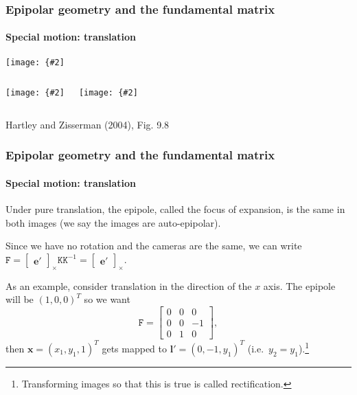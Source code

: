 \documentclass[aspectratio=169]{beamer}
\renewcommand{\vec}[1]{\boldsymbol{#1}}
\newcommand{\mat}[1]{\mathtt{#1}}
\newcommand{\crossmat}[1]{\begin{bmatrix} #1 \end{bmatrix}_{\times}}
\newcommand{\myfig}[3]{\centerline{\texttt{[image: \{\#2]}}}
    \centerline{\scriptsize #3}}
\begin{document}
\begin{frame}
\frametitle{Epipolar geometry and the fundamental matrix}
\framesubtitle{Special motion: translation}

\myfig{2.5in}{HZ-fig8-8a}{(a)}

\medskip

\begin{columns}
\column{1.5in}
\myfig{1.4in}{HZ-fig8-8b}{(b)}
\column{1.5in}
\myfig{1.4in}{HZ-fig8-8c}{(c)}
\end{columns}

\centerline{\scriptsize Hartley and Zisserman (2004), Fig. 9.8}

\end{frame}

\begin{frame}
\frametitle{Epipolar geometry and the fundamental matrix}
\framesubtitle{Special motion: translation}

Under pure translation, the epipole, called the \alert{focus of
  expansion}, is the \alert{same in both images} (we say the images
are \alert{auto-epipolar}).

\medskip

Since we have \alert{no rotation} and the \alert{cameras are the
  same}, we can write
$\mat{F}=\crossmat{\vec{e}'}\mat{K}\mat{K}^{-1}=\crossmat{\vec{e}'}$.

\medskip

As an example, consider translation in the direction of the $x$ axis.
The epipole will be $(1,0,0)^T$ so we want
\begin{equation*}
\mat{F}=\begin{bmatrix} 0 & 0 & 0 \\ 0 & 0 & -1 \\ 0 & 1 & 0
\end{bmatrix},
\end{equation*}
then $\vec{x}=(x_1,y_1,1)^T$ gets mapped to
$\vec{l}'=(0,-1,y_1)^T$ (i.e.\ $y_2=y_1$).\footnote{Transforming images so
  that this is true is called \alert{rectification}.}

\end{frame}
\end{document}
